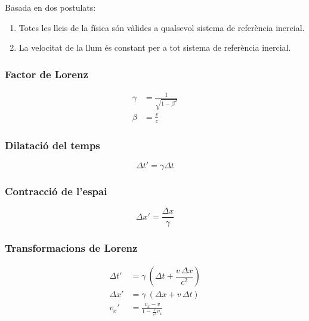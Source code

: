 Basada en dos postulats:

\begin{enumerate}
    \item Totes les lleis de la física són vàlides a qualsevol sistema de
        referència inercial.
    \item La velocitat de la llum és constant per a tot sistema de referència
        inercial.
\end{enumerate}

\subsubsection{Factor de Lorenz}
\label{ssub:factor_de_lorenz}

\begin{align}
    \gamma &= \frac{1}{\sqrt{1 - \beta^2}} \\
    \beta &= \frac{v}{c}
\end{align}

\subsubsection{Dilatació del temps}
\label{ssub:dilatacio_del_temps}

\begin{equation}
    \Delta t' = \gamma  \Delta t
\end{equation}

\subsubsection{Contracció de l'espai}
\label{ssub:contracció_de_l_espai}

\begin{equation}
    \Delta x' = \frac{\Delta x}{\gamma}
\end{equation}

\subsubsection{Transformacions de Lorenz}
\label{ssub:transformacions_de_lorenz}

\begin{align}
    \Delta t' &= \gamma \ \left(\Delta t + \dfrac{v \,\Delta x}{c^{2}} \right) \\
    \Delta x' &= \gamma \ (\Delta x + v \,\Delta t) \\
    v_x' &= \frac{v_x-v}{1-\frac{v}{c^2}v_x}
\end{align}

